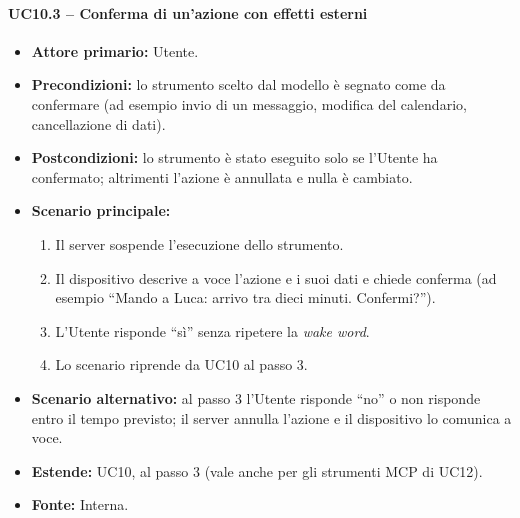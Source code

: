 \documentclass[12pt,a4paper]{article}
\newcommand{\tightlist}{\setlength{\itemsep}{1pt}\setlength{\parskip}{0pt}}
\begin{document}
\paragraph{UC10.3 -- Conferma di un'azione con effetti esterni}

\begin{itemize}

\tightlist

\item \textbf{Attore primario:} Utente.

\item \textbf{Precondizioni:} lo strumento scelto dal modello è segnato come da confermare (ad esempio invio di un messaggio, modifica del calendario, cancellazione di dati).

\item \textbf{Postcondizioni:} lo strumento è stato eseguito solo se l'Utente ha confermato; altrimenti l'azione è annullata e nulla è cambiato.

\item \textbf{Scenario principale:}

\begin{enumerate}

\tightlist

\item Il server sospende l'esecuzione dello strumento.

\item Il dispositivo descrive a voce l'azione e i suoi dati e chiede conferma (ad esempio ``Mando a Luca: arrivo tra dieci minuti. Confermi?'').

\item L'Utente risponde ``sì'' senza ripetere la \emph{wake word}.

\item Lo scenario riprende da UC10 al passo 3.

\end{enumerate}

\item \textbf{Scenario alternativo:} al passo 3 l'Utente risponde ``no'' o non risponde entro il tempo previsto; il server annulla l'azione e il dispositivo lo comunica a voce.

\item \textbf{Estende:} UC10, al passo 3 (vale anche per gli strumenti MCP di UC12).

\item \textbf{Fonte:} Interna.

\end{itemize}
\end{document}
